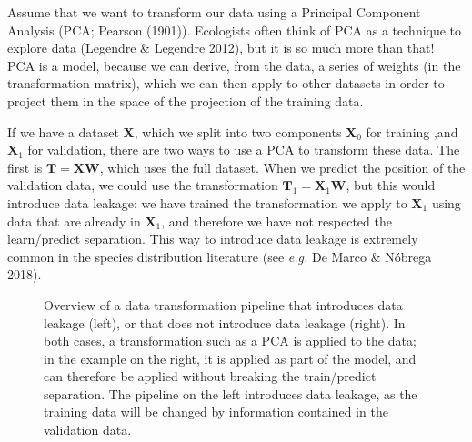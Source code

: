 \documentclass[
  letterpaper,
]{scrbook}
\begin{document}
Assume that we want to transform our data using a Principal Component
Analysis (PCA; Pearson (1901)). Ecologists often think of PCA as a
technique to explore data (Legendre \& Legendre 2012), but it is so much
more than that! PCA is a model, because we can derive, from the data, a
series of weights (in the transformation matrix), which we can then
apply to other datasets in order to project them in the space of the
projection of the training data.

If we have a dataset \(\mathbf{X}\), which we split into two components
\(\mathbf{X}_0\) for training ,and \(\mathbf{X}_1\) for validation,
there are two ways to use a PCA to transform these data. The first is
\(\mathbf{T} = \mathbf{X}\mathbf{W}\), which uses the full dataset. When
we predict the position of the validation data, we could use the
transformation \(\mathbf{T}_1 = \mathbf{X}_1\mathbf{W}\), but this would
introduce data leakage: we have trained the transformation we apply to
\(\mathbf{X}_1\) using data that are already in \(\mathbf{X}_1\), and
therefore we have not respected the learn/predict separation. This way
to introduce data leakage is extremely common in the species
distribution literature (see \emph{e.g.} De Marco \& Nóbrega 2018).

\begin{figure}[pbt]


\caption{\label{fig-predictors-leakage}Overview of a data transformation
pipeline that introduces data leakage (left), or that does not introduce
data leakage (right). In both cases, a transformation such as a PCA is
applied to the data; in the example on the right, it is applied as part
of the model, and can therefore be applied without breaking the
train/predict separation. The pipeline on the left introduces data
leakage, as the training data will be changed by information contained
in the validation data.}

\end{figure}%
\end{document}
